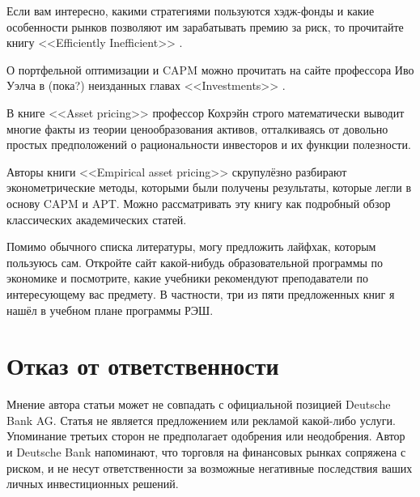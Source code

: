 Если вам интересно, какими стратегиями пользуются хэдж-фонды и какие особенности рынков позволяют им зарабатывать премию за риск, то прочитайте книгу <<Efficiently Inefficient>> \cite{pedersen2015efficiently}.

О портфельной оптимизации и CAPM можно прочитать на сайте профессора Иво Уэлча в (пока?) неизданных главах <<Investments>> \cite{welch}.

В книге <<Asset pricing>> \cite{cochrane2005asset} профессор Кохрэйн строго математически выводит многие факты из теории ценообразования активов, отталкиваясь от довольно простых предположений о рациональности инвесторов и их функции полезности.

Авторы книги <<Empirical asset pricing>> \cite{bali2016empirical} скрупулёзно разбирают эконометрические методы, которыми были получены результаты, которые легли в основу CAPM и APT. Можно рассматривать эту книгу как подробный обзор классических академических статей.

Помимо обычного списка литературы, могу предложить лайфхак, которым пользуюсь сам. Откройте сайт какой-нибудь образовательной программы по экономике и посмотрите, какие учебники рекомендуют преподаватели по интересующему вас предмету. В частности, три из пяти предложенных книг я нашёл в учебном плане программы  РЭШ.

\section{Отказ от ответственности}

Мнение автора статьи может не совпадать с официальной позицией Deutsche Bank AG.
Статья не является предложением или рекламой какой-либо услуги. Упоминание
третьих сторон не предполагает одобрения или неодобрения. Автор и Deutsche Bank
напоминают, что торговля на финансовых рынках сопряжена с риском, и не несут
ответственности за возможные негативные последствия ваших личных инвестиционных
решений.

\en{
\printbibliography[title = \ru{Список литературы}]
}
\printendnotes


